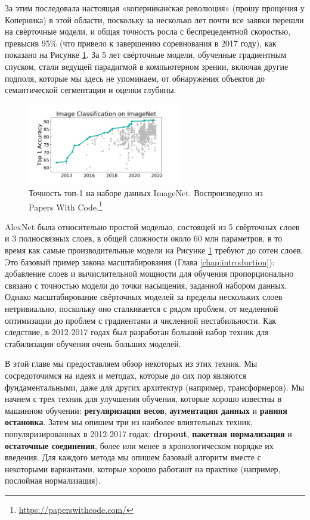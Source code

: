 За этим последовала настоящая «коперниканская революция» (прошу прощения у Коперника) в этой области, поскольку за несколько лет почти все заявки перешли на свёрточные модели, и общая точность росла с беспрецедентной скоростью, превысив 95\% (что привело к завершению соревнования в 2017 году), как показано на Рисунке \ref{fig:papers_with_code}. За 5 лет свёрточные модели, обученные градиентным спуском, стали ведущей парадигмой в компьютерном зрении, включая другие подполя, которые мы здесь не упоминаем, от обнаружения объектов до семантической сегментации и оценки глубины.

\begin{figure}
    \centering
    \includegraphics[width=0.6\textwidth]{images/imagenet}
    \caption[Воспроизведено из Papers With Code.]{Точность топ-1 на наборе данных ImageNet. Воспроизведено из Papers With Code.\footnote{\url{https://paperswithcode.com/}}}
    \label{fig:papers_with_code}
\end{figure}

AlexNet была относительно простой моделью, состоящей из 5 свёрточных слоев и 3 полносвязных слоев, в общей сложности около 60 млн параметров, в то время как самые производительные модели на Рисунке \ref{fig:papers_with_code} требуют до сотен слоев. Это базовый пример закона масштабирования (Глава \ref{chap:introduction}): добавление слоев и вычислительной мощности для обучения пропорционально связано с точностью модели до точки насыщения, заданной набором данных. Однако масштабирование свёрточных моделей за пределы нескольких слоев нетривиально, поскольку оно сталкивается с рядом проблем, от медленной оптимизации до проблем с градиентами и численной нестабильности. Как следствие, в 2012-2017 годах был разработан большой набор техник для стабилизации обучения очень больших моделей.

В этой главе мы предоставляем обзор некоторых из этих техник. Мы сосредоточимся на идеях и методах, которые до сих пор являются фундаментальными, даже для других архитектур (например, трансформеров). Мы начнем с трех техник для улучшения обучения, которые хорошо известны в машинном обучении: \textbf{регуляризация весов}, \textbf{аугментация данных} и \textbf{ранняя остановка}. Затем мы опишем три из наиболее влиятельных техник, популяризированных в 2012-2017 годах: \textbf{dropout}, \textbf{пакетная нормализация} и \textbf{остаточные соединения}, более или менее в хронологическом порядке их введения. Для каждого метода мы опишем базовый алгоритм вместе с некоторыми вариантами, которые хорошо работают на практике (например, послойная нормализация).


